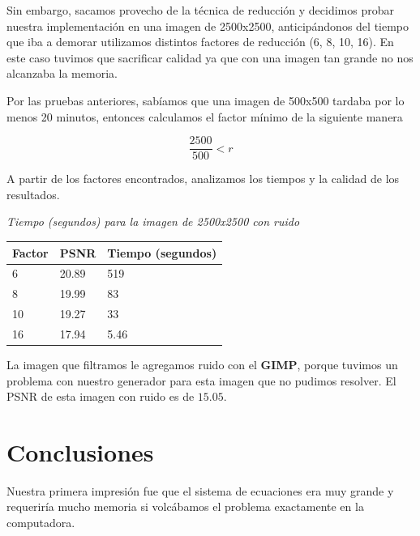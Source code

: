 \documentclass[a4paper]{article}
\begin{document}
Sin embargo, sacamos provecho de la técnica de reducción y decidimos probar nuestra implementación en una imagen de 2500x2500, anticipándonos del tiempo que iba a demorar utilizamos distintos factores de reducción (6, 8, 10, 16). 
En este caso tuvimos que sacrificar calidad ya que con una imagen tan grande no nos alcanzaba la memoria.

Por las pruebas anteriores, sabíamos que una imagen de 500x500 tardaba por lo menos 20 minutos, entonces calculamos el factor mínimo de la siguiente manera

\begin{equation} \frac{2500}{500} < r\end{equation}

A partir de los factores encontrados, analizamos los tiempos y la calidad de los resultados.

\vspace{2em}
\textit{Tiempo (segundos) para la imagen de 2500x2500 con ruido}
\begin{center}
\begin{tabular}{|l|l|l|}
  \hline
  Factor & PSNR & Tiempo (segundos) \\
  \hline
6  & 20.89 & 519 \\
8  & 19.99 & 83 \\
10 & 19.27 & 33 \\
16 & 17.94 & 5.46 \\
\hline
\end{tabular}
\end{center} 
\vspace{1em}

La imagen que filtramos le agregamos ruido con el \textbf{GIMP}, porque tuvimos un problema con nuestro generador para esta imagen que no pudimos resolver. El PSNR de esta imagen con ruido es de $15.05$.




\newpage

\section{Conclusiones}
Nuestra primera impresión fue que el sistema de ecuaciones era muy grande y requeriría mucho memoria si volcábamos el problema exactamente en la computadora.
\end{document}
